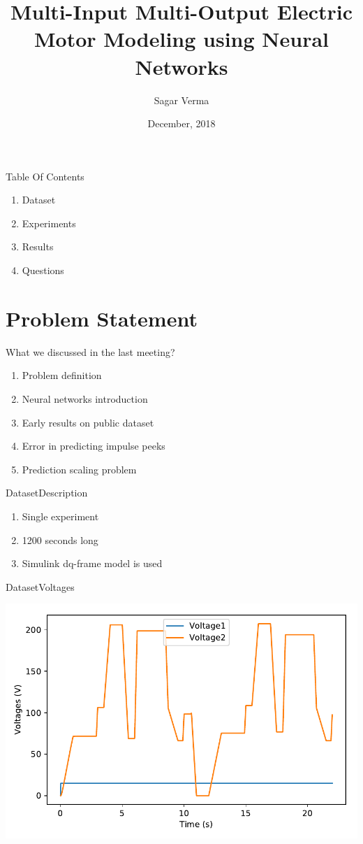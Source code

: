 \documentclass[handout]{beamer}
\title[ \insertdate]{Multi-Input Multi-Output Electric Motor Modeling using Neural Networks}
\author{Sagar Verma}
\institute[Centralesup\'elec and Schneider Electric] %
{
  Centre de Vision Num\'erique,\\
  Centralesup\'elec, Gif-sur-Yvette}
\date{December, 2018}
\begin{document}
\begin{frame}
\titlepage
\end{frame}

\begin{frame}{Table Of Contents}
\begin{enumerate}
\item Dataset
\item Experiments
\item Results
\item Questions
\end{enumerate}
\end{frame}

\section{Problem Statement}

\begin{frame}{What we discussed in the last meeting?}
\begin{enumerate}
  \item Problem definition
  \item Neural networks introduction
  \item Early results on public dataset
  \item Error in predicting impulse peeks
  \item Prediction scaling problem
\end{enumerate}
\end{frame}


\begin{frame}{Dataset}{Description}
  \begin{enumerate}
    \item Single experiment
    \item 1200 seconds long
    \item Simulink dq-frame model is used
  \end{enumerate}
\end{frame}

\begin{frame}{Dataset}{Voltages}
\begin{center}
  \includegraphics[scale=0.6]{images/voltages_vs_time}
\end{center}
\end{frame}
\end{document}
